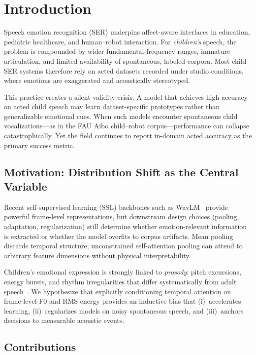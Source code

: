 \section{Introduction}
\label{sec:introduction}

Speech emotion recognition (SER) underpins affect-aware interfaces in education, pediatric healthcare, and human--robot interaction.
For \textit{children's} speech, the problem is compounded by wider fundamental-frequency ranges, immature articulation, and limited availability of spontaneous, labeled corpora.
Most child SER systems therefore rely on acted datasets recorded under studio conditions, where emotions are exaggerated and acoustically stereotyped.

This practice creates a silent validity crisis.
A model that achieves high accuracy on acted child speech may learn dataset-specific prototypes rather than generalizable emotional cues.
When such models encounter spontaneous child vocalizations---as in the FAU Aibo child--robot corpus---performance can collapse catastrophically.
Yet the field continues to report in-domain acted accuracy as the primary success metric.

\subsection{Motivation: Distribution Shift as the Central Variable}

Recent self-supervised learning (SSL) backbones such as WavLM~\cite{chen2022wavlm} provide powerful frame-level representations, but downstream design choices (pooling, adaptation, regularization) still determine whether emotion-relevant information is extracted or whether the model overfits to corpus artifacts.
Mean pooling discards temporal structure; unconstrained self-attention pooling can attend to arbitrary feature dimensions without physical interpretability.

Children's emotional expression is strongly linked to \textit{prosody}: pitch excursions, energy bursts, and rhythm irregularities that differ systematically from adult speech~\cite{fan2024children}.
We hypothesize that explicitly conditioning temporal attention on frame-level F0 and RMS energy provides an inductive bias that (i)~accelerates learning, (ii)~regularizes models on noisy spontaneous speech, and (iii)~anchors decisions to measurable acoustic events.

\subsection{Contributions}

